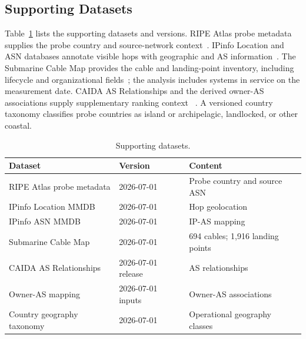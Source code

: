 \subsection{Supporting Datasets}
\label{subsec:supporting_data}

Table~\ref{tab:supporting_datasets} lists the supporting datasets and versions.
RIPE Atlas probe metadata supplies the probe country and source-network
context~\cite{ripe_atlas}. IPinfo Location and ASN databases annotate visible
hops with geographic and AS information~\cite{ipinfo}. The Submarine Cable Map
provides the cable and landing-point inventory, including lifecycle and
organizational fields~\cite{telegeography_submarine_map}; the analysis includes
systems in service on the measurement date. CAIDA AS Relationships and the
derived owner-AS associations supply supplementary ranking context
~\cite{caida_as_relationships}. A versioned country taxonomy classifies probe
countries as island or archipelagic, landlocked, or other coastal.

\begin{table}[htb]
  \centering
  \caption{Supporting datasets.}
  \label{tab:supporting_datasets}
  \footnotesize
  \begin{tabular}{p{}p{}p{}}
    \toprule
    Dataset & Version & Content \\
    \midrule
    RIPE Atlas probe metadata & 2026-07-01 & Probe country and source ASN \\
    IPinfo Location MMDB & 2026-07-01 & Hop geolocation \\
    IPinfo ASN MMDB & 2026-07-01 & IP-AS mapping \\
    Submarine Cable Map & 2026-07-01 & 694 cables; 1,916 landing points \\
    CAIDA AS Relationships & 2026-07-01 release & AS relationships \\
    Owner-AS mapping & 2026-07-01 inputs & Owner-AS associations \\
    Country geography taxonomy & 2026-07-01 & Operational geography classes \\
    \bottomrule
  \end{tabular}
\end{table}
